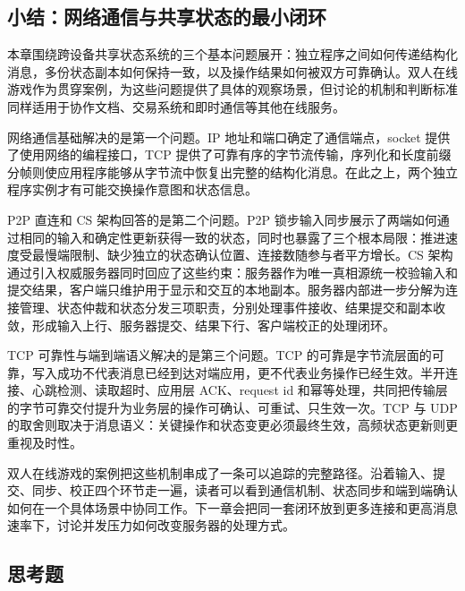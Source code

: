 \subsection{小结：网络通信与共享状态的最小闭环}\label{sec2:summary}

本章围绕跨设备共享状态系统的三个基本问题展开：独立程序之间如何传递结构化消息，多份状态副本如何保持一致，以及操作结果如何被双方可靠确认。双人在线游戏作为贯穿案例，为这些问题提供了具体的观察场景，但讨论的机制和判断标准同样适用于协作文档、交易系统和即时通信等其他在线服务。

网络通信基础解决的是第一个问题。IP 地址和端口确定了通信端点，socket 提供了使用网络的编程接口，TCP 提供了可靠有序的字节流传输，序列化和长度前缀分帧则使应用程序能够从字节流中恢复出完整的结构化消息。在此之上，两个独立程序实例才有可能交换操作意图和状态信息。

P2P 直连和 CS 架构回答的是第二个问题。P2P 锁步输入同步展示了两端如何通过相同的输入和确定性更新获得一致的状态，同时也暴露了三个根本局限：推进速度受最慢端限制、缺少独立的状态确认位置、连接数随参与者平方增长。CS 架构通过引入权威服务器同时回应了这些约束：服务器作为唯一真相源统一校验输入和提交结果，客户端只维护用于显示和交互的本地副本。服务器内部进一步分解为连接管理、状态仲裁和状态分发三项职责，分别处理事件接收、结果提交和副本收敛，形成输入上行、服务器提交、结果下行、客户端校正的处理闭环。

TCP 可靠性与端到端语义解决的是第三个问题。TCP 的可靠是字节流层面的可靠，写入成功不代表消息已经到达对端应用，更不代表业务操作已经生效。半开连接、心跳检测、读取超时、应用层 ACK、request id 和幂等处理，共同把传输层的字节可靠交付提升为业务层的操作可确认、可重试、只生效一次。TCP 与 UDP 的取舍则取决于消息语义：关键操作和状态变更必须最终生效，高频状态更新则更重视及时性。

双人在线游戏的案例把这些机制串成了一条可以追踪的完整路径。沿着输入、提交、同步、校正四个环节走一遍，读者可以看到通信机制、状态同步和端到端确认如何在一个具体场景中协同工作。下一章会把同一套闭环放到更多连接和更高消息速率下，讨论并发压力如何改变服务器的处理方式。

\subsection{思考题}

